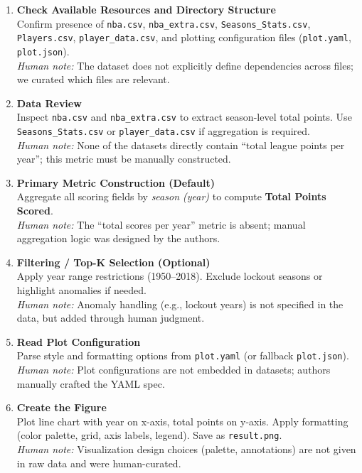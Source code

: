 \begin{enumerate}[itemsep=0pt, parsep=0pt, topsep=0pt, leftmargin=2em]
    \item \textbf{Check Available Resources and Directory Structure} \\
    Confirm presence of \texttt{nba.csv}, \texttt{nba\_extra.csv}, \texttt{Seasons\_Stats.csv}, \texttt{Players.csv}, \texttt{player\_data.csv}, and plotting configuration files (\texttt{plot.yaml}, \texttt{plot.json}). \\
    \emph{Human note:} The dataset does not explicitly define dependencies across files; we curated which files are relevant.

    \item \textbf{Data Review} \\
    Inspect \texttt{nba.csv} and \texttt{nba\_extra.csv} to extract season-level total points. Use \texttt{Seasons\_Stats.csv} or \texttt{player\_data.csv} if aggregation is required. \\
    \emph{Human note:} None of the datasets directly contain ``total league points per year''; this metric must be manually constructed.

    \item \textbf{Primary Metric Construction (Default)} \\
    Aggregate all scoring fields by \emph{season (year)} to compute \textbf{Total Points Scored}. \\
    \emph{Human note:} The ``total scores per year'' metric is absent; manual aggregation logic was designed by the authors.

    \item \textbf{Filtering / Top-K Selection (Optional)} \\
    Apply year range restrictions (1950--2018). Exclude lockout seasons or highlight anomalies if needed. \\
    \emph{Human note:} Anomaly handling (e.g., lockout years) is not specified in the data, but added through human judgment.

    \item \textbf{Read Plot Configuration} \\
    Parse style and formatting options from \texttt{plot.yaml} (or fallback \texttt{plot.json}). \\
    \emph{Human note:} Plot configurations are not embedded in datasets; authors manually crafted the YAML spec.

    \item \textbf{Create the Figure} \\
    Plot line chart with year on x-axis, total points on y-axis. Apply formatting (color palette, grid, axis labels, legend). Save as \texttt{result.png}. \\
    \emph{Human note:} Visualization design choices (palette, annotations) are not given in raw data and were human-curated.


\end{enumerate}
